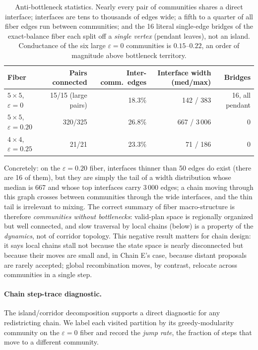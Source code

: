 \documentclass[11pt]{article}
\begin{document}
\begin{table}[H]
\centering
\small
\begin{tabular}{lrrrr}
\toprule
Fiber & Pairs connected & Inter-comm.\ edges & Interface width (med/max) & Bridges \\
\midrule
$5 \times 5$, $\varepsilon = 0$    & 15/15 (large pairs) & 18.3\% & 142 / 383 & 16, all pendant \\
$5 \times 5$, $\varepsilon = 0.20$ & 320/325 & 26.8\% & 667 / 3\,006 & 0 \\
$4 \times 4$, $\varepsilon = 0.25$ & 21/21   & 23.3\% & 71 / 186 & 0 \\
\bottomrule
\end{tabular}
\caption{Anti-bottleneck statistics. Nearly every pair of communities
  shares a direct interface; interfaces are tens to thousands of edges
  wide; a fifth to a quarter of all fiber edges run between
  communities; and the 16 literal single-edge bridges of the
  exact-balance fiber each split off a \emph{single vertex} (pendant
  leaves), not an island. Conductance of the six large
  $\varepsilon = 0$ communities is $0.15$--$0.22$, an order of
  magnitude above bottleneck territory.}
\label{tab:narrow-throats}
\end{table}

Concretely: on the $\varepsilon = 0.20$ fiber, interfaces thinner than
50 edges do exist (there are 16 of them), but they are simply the tail
of a width distribution whose median is 667 and whose top interfaces
carry $3\,000$ edges; a chain moving through this graph crosses
between communities through the wide interfaces, and the thin tail is
irrelevant to mixing. The correct summary of fiber macro-structure is
therefore \emph{communities without bottlenecks}: valid-plan space is
regionally organized but well connected, and slow traversal by local
chains (below) is a property of the \emph{dynamics}, not of corridor
topology. This negative result matters for chain design: it says
local chains stall not because the state space is nearly disconnected
but because their moves are small and, in Chain E's case, because
distant proposals are rarely accepted; global recombination moves, by
contrast, relocate across communities in a single step.

\paragraph{Chain step-trace diagnostic.}\label{sec:fiber-trace}

The island/corridor decomposition supports a direct diagnostic for any
redistricting chain. We label each visited partition by its
greedy-modularity community on the $\varepsilon = 0$ fiber and record
the \emph{jump rate}, the fraction of steps that move to a
different community.
\end{document}
